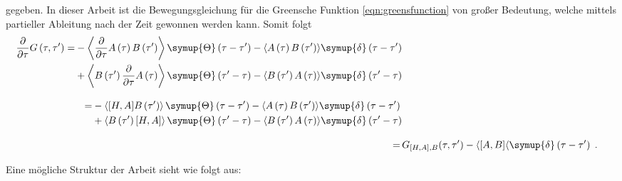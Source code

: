 gegeben.
In dieser Arbeit ist die Bewegungsgleichung für die Greensche Funktion \eqref{eqn:greensfunction} von großer Bedeutung, welche mittels 
partieller Ableitung nach der Zeit gewonnen werden kann.
Somit folgt
\begin{align*}
    \begin{split}
    \frac{\partial}{\partial \tau} G \left (\tau, \tau' \right) = 
    &- \left \langle \frac{\partial}{\partial \tau}A \left (\tau \right ) B \left ( \tau' \right ) \right \rangle
    \symup{\Theta} \left ( \tau - \tau' \right) -  \langle A \left (\tau \right ) B \left ( \tau' \right ) \rangle \symup{\delta} \left ( \tau - \tau' \right)\\
    &+ \left \langle B \left ( \tau' \right ) \frac{\partial}{\partial \tau}A \left (\tau \right ) \right \rangle \symup{\Theta} \left ( \tau' - \tau \right)
    -  \langle B \left ( \tau' \right ) A \left (\tau \right ) \rangle \symup{\delta} \left ( \tau' - \tau \right)
    \end{split}
    \\[2ex]
    \begin{split}
    = &- \left \langle [H,A] B \left ( \tau' \right ) \right \rangle
    \symup{\Theta} \left ( \tau - \tau' \right) -  \langle A \left (\tau \right ) B \left ( \tau' \right ) \rangle \symup{\delta} \left ( \tau - \tau' \right)\\
    &+ \left \langle B \left ( \tau' \right ) [H,A] \right \rangle \symup{\Theta} \left ( \tau' - \tau \right)
    -  \langle B \left ( \tau' \right ) A \left (\tau \right ) \rangle \symup{\delta} \left ( \tau' - \tau \right)
    \end{split}
    \\[2ex]
    =\, & G_{[H,A],B}(\tau, \tau') - \langle [A,B] \langle \symup{\delta} \left ( \tau - \tau' \right) \; \text{.}
\end{align*} 








Eine mögliche Struktur der Arbeit sieht wie folgt aus:

